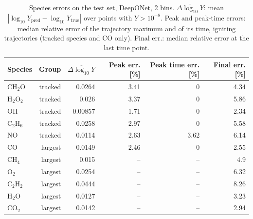 \begin{table}[htbp]
    \centering
    \small
    \begin{tabular}{lrrrrr}
        \hline
        Species & Group & $\overline{\Delta\log_{10}Y}$ & Peak err. [\%] & Peak time err. [\%] & Final err. [\%] \\
        \hline
        $\mathrm{CH_{2}O}$ & tracked & 0.0264 & 3.41 & 0 & 4.34 \\
        $\mathrm{H_{2}O_{2}}$ & tracked & 0.026 & 3.37 & 0 & 5.86 \\
        $\mathrm{OH}$ & tracked & 0.00857 & 1.71 & 0 & 2.34 \\
        $\mathrm{C_{2}H_{6}}$ & tracked & 0.0258 & 2.97 & 0 & 5.58 \\
        $\mathrm{NO}$ & tracked & 0.0114 & 2.63 & 3.62 & 6.14 \\
        $\mathrm{CO}$ & largest & 0.0149 & 2.46 & 0 & 2.55 \\
        $\mathrm{CH_{4}}$ & largest & 0.015 & -- & -- & 4.9 \\
        $\mathrm{O_{2}}$ & largest & 0.0254 & -- & -- & 6.32 \\
        $\mathrm{C_{2}H_{2}}$ & largest & 0.0444 & -- & -- & 8.26 \\
        $\mathrm{H_{2}O}$ & largest & 0.0127 & -- & -- & 3.23 \\
        $\mathrm{CO_{2}}$ & largest & 0.0142 & -- & -- & 2.94 \\
        \hline
    \end{tabular}
    \caption{Species errors on the test set, DeepONet, 2 bins. $\overline{\Delta\log_{10}Y}$: mean $|\log_{10}Y_\mathrm{pred}-\log_{10}Y_\mathrm{true}|$ over points with $Y>10^{-8}$. Peak and peak-time errors: median relative error of the trajectory maximum and of its time, igniting trajectories (tracked species and CO only). Final err.: median relative error at the last time point.}
    \label{tab:species_deeponet_predicted_b2}
\end{table}
